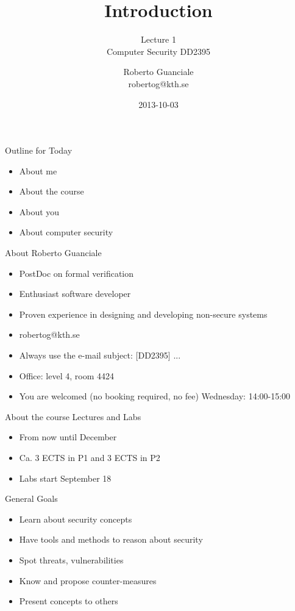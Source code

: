 \documentclass{beamer}
\title{Introduction}
\subtitle{Lecture 1 \\ Computer Security DD2395}
\author[R. Guanciale]{
  Roberto Guanciale\\
  robertog@kth.se
}
\date{2013-10-03}
\begin{document}
\begin{frame}[plain]
  \titlepage
\end{frame}

\begin{frame}{Outline for Today}
  \begin{itemize}
    \item About me
    \item About the course
    \item About you
    \item About computer security
  \end{itemize}
\end{frame}

\begin{frame}{About Roberto Guanciale}
  \begin{itemize}
    \item PostDoc on formal verification
    \item Enthusiast software developer
    \item Proven experience in designing and developing \alert{non}-secure
      systems
    \item robertog@kth.se
    \item \alert{Always} use the e-mail subject: [DD2395] ...
    \item Office: level 4, room 4424
    \item You are welcomed (no booking required, no fee) Wednesday:
      14:00-15:00
  \end{itemize}
\end{frame}

\begin{frame}{About the course}
  Lectures and Labs
  \begin{itemize}
    \item From now until December
    \item Ca. 3 ECTS in P1 and 3 ECTS in P2
    \item Labs start September 18
  \end{itemize}
\end{frame}

\begin{frame}{General Goals}
  \begin{itemize}
    \item Learn about security concepts
    \item Have tools and methods to reason about security
    \item Spot threats, vulnerabilities
    \item Know and propose counter-measures
    \item Present concepts to others 
  \end{itemize}
\end{frame}
\end{document}
